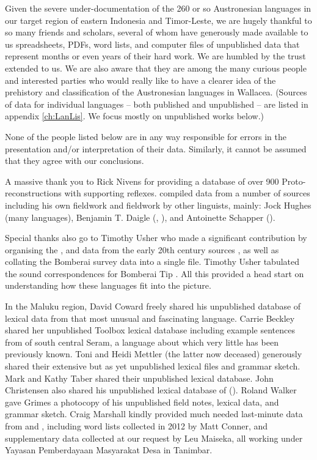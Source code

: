 Given the severe under-documentation of the 260 or so Austronesian languages
in our target region of eastern Indonesia and Timor-Leste,
we are hugely thankful to so many friends and scholars,
several of whom have generously made available to us spreadsheets,
PDFs, word lists, and computer files of unpublished data that represent months or even years of their hard work.
We are humbled by the trust extended to us.
We are also aware that they are among the many curious people and interested parties
who would really like to have a clearer idea of the prehistory and classification of the Austronesian languages in Wallacea.
(Sources of data for individual languages -- both published and unpublished -- are listed in appendix \ref{ch:LanLis}.
We focus mostly on unpublished works below.)

None of the people listed below are in any way responsible
for errors in the presentation and/or interpretation of their data.
Similarly, it cannot be assumed that they agree with our conclusions.

A massive thank you to Rick Nivens for providing a database of
over 900 Proto- reconstructions with supporting reflexes.
\citet{Nivens2017} compiled data from a number of sources including his
own fieldwork and fieldwork by other linguists, mainly: Jock Hughes (many languages),
Benjamin T. Daigle (, ), and Antoinette Schapper ().

Special thanks also go to Timothy Usher who made a significant contribution by organising the ,
 and  data from the early 20th century sources \citep{Usher2019},
as well as collating the Bomberai survey data \citep{Donohue2010, Narfafan2011} into a single file.
Timothy Usher tabulated the sound correspondences for Bomberai Tip \citep{Usher2018}.
All this provided a head start on understanding how these languages fit into the picture.

In the Maluku region,
David Coward freely shared his unpublished database of  lexical data
from that most unusual and fascinating language.
Carrie Beckley shared her unpublished Toolbox lexical database
including example sentences from  of south central Seram,
a language about which very little has been previously known.
Toni and Heidi Mettler (the latter now deceased) generously
shared their extensive but as yet unpublished  lexical files and grammar sketch.
Mark and Kathy Taber shared their unpublished lexical database.
John Christensen also shared his unpublished lexical database of  ().
Roland Walker gave Grimes a photocopy of his unpublished  field notes,
lexical data, and grammar sketch. Craig Marshall kindly
provided much needed last-minute data from  and ,
including word lists collected in 2012 by Matt Conner,
and supplementary data collected at our request by Leu Maiseka,
all working under Yayasan Pemberdayaan Masyarakat Desa in Tanimbar.

